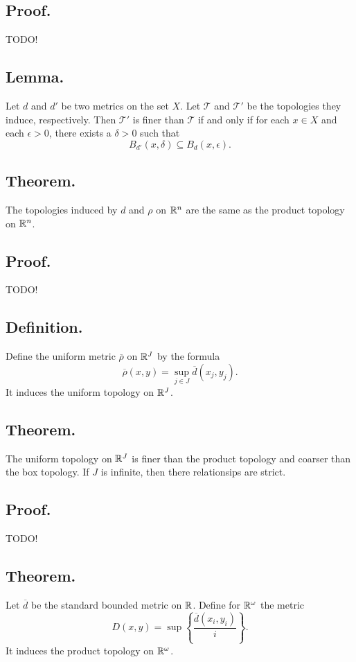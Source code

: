 \documentclass[titlepage]{article}
\begin{document}
\subsection{Proof.} TODO!

\subsection{Lemma.} Let $d$ and $d'$ be two metrics on the set $X$. Let $\mathcal{T}$ and $\mathcal{T}'$ be the topologies they induce, respectively. Then $\mathcal{T}'$ is finer than $\mathcal{T}$ if and only if for each $x \in X$ and each $\epsilon > 0$, there exists a $\delta > 0$ such that 
$$B_{d'}(x, \delta) \subseteq B_{d}(x, \epsilon).$$

\subsection{Theorem.} The topologies induced by $d$ and $\rho$ on $\mathbb{R}^{n}$ are the same as the product topology on $\mathbb{R}^{n}$.

\subsection{Proof.} TODO!

\subsection{Definition.} Define the uniform metric $\overline{\rho}$ on $\mathbb{R}^{J}$ by the formula 
$$\overline{\rho}(x, y) = \sup_{j \in J} \overline{d}(x_{j}, y_{j}).$$
It induces the uniform topology on $\mathbb{R}^{J}$.

\subsection{Theorem.} The uniform topology on $\mathbb{R}^{J}$ is finer than the product topology and coarser than the box topology. If $J$ is infinite, then there relationsips are strict.

\subsection{Proof.} TODO!

\subsection{Theorem.} Let $\overline{d}$ be the standard bounded metric on $\mathbb{R}$. Define for $\mathbb{R}^{\omega}$ the metric 
$$D(x, y) = \sup \left\{\frac{\overline{d}(x_{i}, y_{i})}{i}\right\}.$$
It induces the product topology on $\mathbb{R}^{\omega}$.
\end{document}
